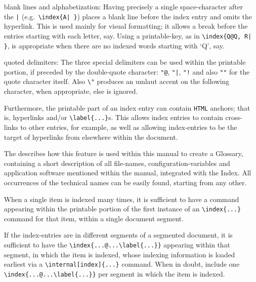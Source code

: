 \begin{htmllist}
%
%
\item [blank lines and alphabetization: ]
Having precisely a single space-character after the \verb+|+ 
(e.g.\ \verb+\index{A| }+) 
places a blank line before the index entry and omits the hyperlink.
This is used mainly for visual formatting; it allows a break before the entries
starting with each letter, say. Using a printable-key, as in \verb+\index{Q@Q, R| }+,
is appropriate when there are no indexed words starting with `Q', say.

%
\item [quoted delimiters: ]
The three special delimiters can be used within the printable portion,
if preceded by the double-quote character: \verb+"@+, \verb+"|+, \verb+"!+ 
and also \verb+""+ for the quote character itself. 
Also \verb|\"| produces an umlaut accent on the following character, 
when appropriate, else is ignored.
%
\end{htmllist}%

%
\html{\\}\noindent
%
Furthermore, the printable part of an index entry can contain \texttt{HTML}
anchors; that is, hyperlinks and/or \verb|\label{...}|s.
This allows index entries to contain cross-links to other entries, for example,
as well as allowing index-entries to be the target of hyperlinks from elsewhere
within the document. 

The  describes how this feature is used within this
manual to create a Glossary, containing a short description of all file-names,
configuration-variables and application software mentioned within the manual,
integrated with the Index. All occurrences of the technical names can be
easily found, starting from any other.


When a single item is indexed many times, it is sufficient 
to have a  command appearing within the printable portion 
of the first instance of an \verb|\index{...}| command for that item,
within a single document segment. 

\medskip

If the index-entries are in different segments of a segmented document, 
it is sufficient to have the  \verb|\index{...@...\label{...}}| appearing 
within that segment, in which the item is indexed, whose indexing information 
is loaded earliest via a \verb|\internal[index]{...}| command.
When in doubt, include one \verb|\index{...@...\label{...}}| per segment 
in which the item is indexed.


